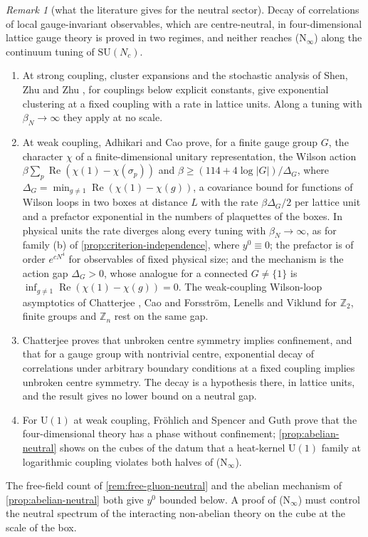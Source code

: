 \documentclass[11pt,a4paper]{amsart}
\theoremstyle{definition}
\theoremstyle{remark}
\newtheorem{remark}[theorem]{Remark}
\numberwithin{equation}{section}
\newcommand{\Z}{\mathbb{Z}}          %
\newcommand{\abs}[1]{\lvert #1\rvert}      %
\newcommand{\SU}{\mathrm{SU}}              %
\newcommand{\U}{\mathrm{U}}                %
\begin{document}
\begin{remark}[what the literature gives for the neutral sector]\label{rem:neutral-literature}
Decay of correlations of local gauge-invariant observables, which are centre-neutral, in four-dimensional lattice gauge theory is proved in two regimes, and neither reaches \textup{(N$_\infty$)} along the continuum tuning of $\SU(N_c)$.
\begin{enumerate}[label=\textup{(\roman*)},leftmargin=*]
\item At strong coupling, cluster expansions \cite{osterwalder1978,seiler1982} and the stochastic analysis of Shen, Zhu and Zhu \cite{shen2023}, for couplings below explicit constants, give exponential clustering at a fixed coupling with a rate in lattice units. Along a tuning with $\beta_N\to\infty$ they apply at no scale.
\item At weak coupling, Adhikari and Cao \cite{adhikari2025} prove, for a finite gauge group $G$, the character $\chi$ of a finite-dimensional unitary representation, the Wilson action $\beta\sum_p\operatorname{Re}(\chi(1)-\chi(\sigma_p))$ and $\beta\ge(114+4\log\abs G)/\Delta_G$, where $\Delta_G=\min_{g\ne1}\operatorname{Re}(\chi(1)-\chi(g))$, a covariance bound for functions of Wilson loops in two boxes at distance $L$ with the rate $\beta\Delta_G/2$ per lattice unit and a prefactor exponential in the numbers of plaquettes of the boxes. In physical units the rate diverges along every tuning with $\beta_N\to\infty$, as for family \textup{(b)} of \cref{prop:criterion-independence}, where $y^0\equiv0$; the prefactor is of order $e^{cN^4}$ for observables of fixed physical size; and the mechanism is the action gap $\Delta_G>0$, whose analogue for a connected $G\ne\{1\}$ is $\inf_{g\ne1}\operatorname{Re}(\chi(1)-\chi(g))=0$. The weak-coupling Wilson-loop asymptotics of Chatterjee \cite{chatterjee2020}, Cao \cite{cao2020} and Forsstr\"om, Lenells and Viklund \cite{forsstrom2022} for $\Z_2$, finite groups and $\Z_n$ rest on the same gap.
\item Chatterjee \cite{chatterjee2021} proves that unbroken centre symmetry implies confinement, and that for a gauge group with nontrivial centre, exponential decay of correlations under arbitrary boundary conditions at a fixed coupling implies unbroken centre symmetry. The decay is a hypothesis there, in lattice units, and the result gives no lower bound on a neutral gap.
\item For $\U(1)$ at weak coupling, Fr\"ohlich and Spencer \cite{frohlich1982} and Guth \cite{guth1980} prove that the four-dimensional theory has a phase without confinement; \cref{prop:abelian-neutral} shows on the cubes of the datum that a heat-kernel $\U(1)$ family at logarithmic coupling violates both halves of \textup{(N$_\infty$)}.
\end{enumerate}
The free-field count of \cref{rem:free-gluon-neutral} and the abelian mechanism of \cref{prop:abelian-neutral} both give $y^0$ bounded below. A proof of \textup{(N$_\infty$)} must control the neutral spectrum of the interacting non-abelian theory on the cube at the scale of the box.
\end{remark}
\end{document}
